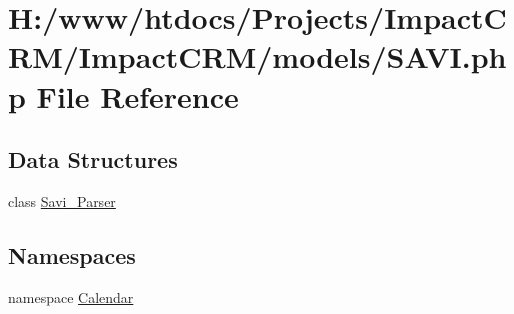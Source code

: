 \hypertarget{SAVI_8php}{
\section{H:/www/htdocs/Projects/ImpactCRM/ImpactCRM/models/SAVI.php File Reference}
\label{SAVI_8php}
}
\subsection*{Data Structures}
\begin{DoxyCompactItemize}
\item 
class \hyperlink{classSavi__Parser}{Savi\_\-Parser}
\end{DoxyCompactItemize}
\subsection*{Namespaces}
\begin{DoxyCompactItemize}
\item 
namespace \hyperlink{namespaceCalendar}{Calendar}
\end{DoxyCompactItemize}
